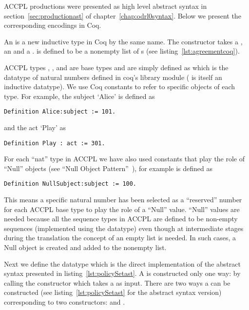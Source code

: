\ac{ACCPL} productions were presented as high level abstract syntax in section~\ref{sec:productionast} of chapter~\ref{chap:odrl0syntax}. Below we present the corresponding encodings in Coq. 

An  is a new inductive type in Coq by the same name. The constructor  takes a , an  and a .  is defined to be a nonempty list of s (see listing~\ref{lst:agreementcoq}). 

\ac{ACCPL} types , ,  and  are base types and are simply defined as  which is the datatype of natural numbers defined in coq's library module  ( is itself an inductive datatype). We use Coq constants to refer to specific objects of each type. For example, the subject `Alice' is defined as \begin{verbatim}Definition Alice:subject := 101.\end{verbatim} and the act `Play' as \begin{verbatim}Definition Play : act := 301.\end{verbatim}For each ``nat'' type in \ac{ACCPL} we have also used constants that play the role of ``Null'' objects (see ``Null Object Pattern''~\cite{martin1998pattern}), for example  is defined as \begin{verbatim}Definition NullSubject:subject := 100.\end{verbatim} 

This means a specific natural number has been selected as a ``reserved'' number for each \ac{ACCPL} base type to play the role of a ``Null'' value. ``Null'' values are needed because all the sequence types in \ac{ACCPL} are defined to be non-empty sequences (implemented using the  datatype) even though at intermediate stages during the translation the concept of an empty list is needed. In such cases, a Null object is created and added to the nonempty list.

Next we define the  datatype which is the direct implementation of the abstract syntax presented in listing~\ref{lst:policySetast}. A  is constructed only one way: by calling the  constructor which takes a  as input. There are two ways a  can be constructed (see listing~\ref{lst:policySetast} for the abstract syntax version) corresponding to two constructors:  and . 

